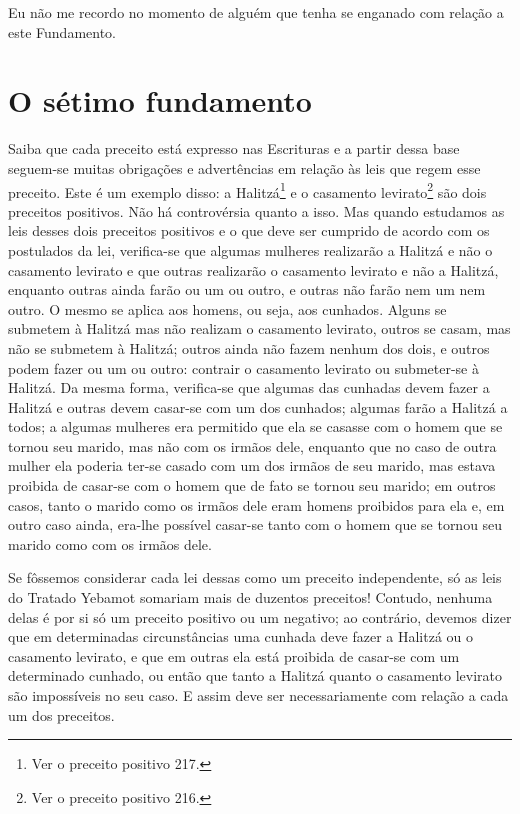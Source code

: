 Eu não me recordo no momento de alguém que tenha se enganado com relação
a este Fundamento.

\chapter*{O sétimo fundamento}

Saiba que cada preceito está expresso nas Escrituras e a partir dessa
base seguem-se muitas obrigações e advertências em relação às leis que
regem esse preceito. Este é um exemplo disso: a
Halitzá\footnote{Ver o preceito positivo 217.} e o casamento
levirato\footnote{Ver o preceito positivo 216.} são dois preceitos positivos. Não há
controvérsia quanto a isso. Mas quando estudamos as leis desses dois
preceitos positivos e o que deve ser cumprido de acordo com os
postulados da lei, verifica-se que algumas mulheres realizarão a
Halitzá e não o casamento levirato e que outras realizarão o
casamento levirato e não a Halitzá, enquanto outras ainda farão ou
um ou outro, e outras não farão nem um nem outro. O mesmo se aplica aos
homens, ou seja, aos cunhados. Alguns se submetem à Halitzá mas não
realizam o casamento levirato, outros se casam, mas não se submetem à
Halitzá; outros ainda não fazem nenhum dos dois, e outros podem
fazer ou um ou outro: contrair o casamento levirato ou submeter-se à
Halitzá. Da mesma forma, verifica-se que algumas das cunhadas devem
fazer a Halitzá e outras devem casar-se com um dos cunhados; algumas
farão a Halitzá a todos; a algumas mulheres era permitido que ela se
casasse com o homem que se tornou seu marido, mas não com os irmãos
dele, enquanto que no caso de outra mulher ela poderia ter-se casado com
um dos irmãos de seu marido, mas estava proibida de casar-se com o homem
que de fato se tornou seu marido; em outros casos, tanto o marido como
os irmãos dele eram homens proibidos para ela e, em outro caso ainda,
era-lhe possível casar-se tanto com o homem que se tornou seu marido
como com os irmãos dele.

Se fôssemos considerar cada lei dessas como um preceito independente,
só as leis do Tratado Yebamot somariam mais de duzentos preceitos!
Contudo, nenhuma delas é por si só um preceito positivo ou um negativo;
ao contrário, devemos dizer que em determinadas circunstâncias uma
cunhada deve fazer a Halitzá ou o casamento levirato, e que em
outras ela está proibida de casar-se com um determinado cunhado, ou
então que tanto a Halitzá quanto o casamento levirato são
impossíveis no seu caso. E assim deve ser necessariamente com relação a
cada um dos preceitos.

